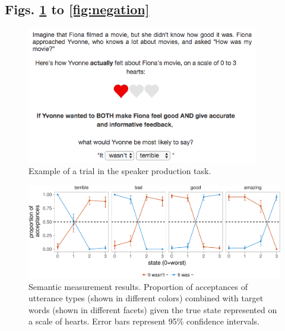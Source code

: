 \documentclass[12pt]{article}
\newcommand{\beginsupplement}{%
        \setcounter{table}{0}
        \renewcommand{\thetable}{S\arabic{table}}%
        \setcounter{figure}{0}
        \renewcommand{\thefigure}{S\arabic{figure}}%
     }
\begin{document}
\newpage

\subsection*{Figs. \ref{fig:screenshot} to \ref{fig:negation}}\label{supplemental-figures}

\setcounter{figure}{0}    
\beginsupplement

\begin{figure}[!h]
\centering
\includegraphics[width=3.98in]{fig/screenshot} \caption{Example of a trial in the speaker production task.}\label{fig:screenshot}
\end{figure}

\begin{figure}[!h]
\includegraphics[width=\textwidth]{polite_manuscript_files/figure-latex/litsem-1} \caption{Semantic measurement results. Proportion of acceptances of utterance types (shown in different colors) combined with target words (shown in different facets) given the true state represented on a scale of hearts. Error bars represent 95\% confidence intervals.}\label{fig:litsem}
\end{figure}
\end{document}
